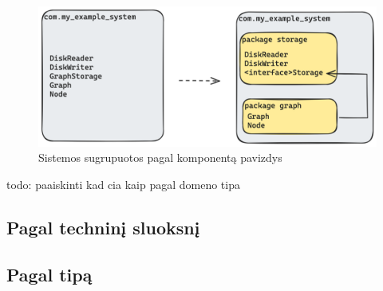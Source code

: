 \begin{figure}[H]
    \centering
    \includegraphics[scale=0.2]{img/component_packaging}
    \caption{Sistemos sugrupuotos pagal komponentą pavizdys}
    \label{img:component_packaging}
\end{figure}
todo: paaiskinti kad cia kaip pagal domeno tipa


\subsection{Pagal techninį sluoksnį}
\subsection{Pagal tipą}